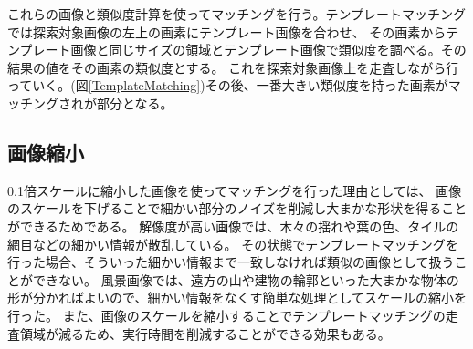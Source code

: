 \documentclass[titlepage,dvipdfmx]{jsarticle}
\begin{document}
これらの画像と類似度計算を使ってマッチングを行う。テンプレートマッチングでは探索対象画像の左上の画素にテンプレート画像を合わせ、
その画素からテンプレート画像と同じサイズの領域とテンプレート画像で類似度を調べる。その結果の値をその画素の類似度とする。
これを探索対象画像上を走査しながら行っていく。(図\ref{TemplateMatching})その後、一番大きい類似度を持った画素がマッチングされが部分となる。

\subsection{画像縮小}
0.1倍スケールに縮小した画像を使ってマッチングを行った理由としては、
画像のスケールを下げることで細かい部分のノイズを削減し大まかな形状を得ることができるためである。
解像度が高い画像では、木々の揺れや葉の色、タイルの網目などの細かい情報が散乱している。
その状態でテンプレートマッチングを行った場合、そういった細かい情報まで一致しなければ類似の画像として扱うことができない。
風景画像では、遠方の山や建物の輪郭といった大まかな物体の形が分かればよいので、細かい情報をなくす簡単な処理としてスケールの縮小を行った。
また、画像のスケールを縮小することでテンプレートマッチングの走査領域が減るため、実行時間を削減することができる効果もある。
\end{document}
